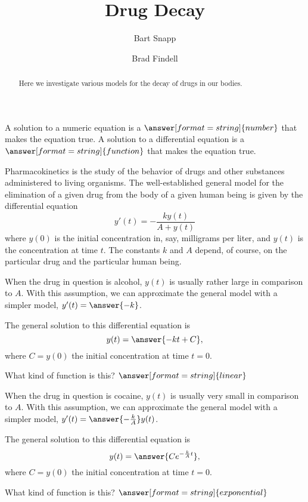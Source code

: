\documentclass{ximera}
\title{Drug Decay}
\author{Bart Snapp \and Brad Findell}
\begin{document}
\begin{abstract}
Here we investigate various models for the decay of drugs in our bodies.  
\end{abstract}
\maketitle

\begin{question}
A solution to a numeric equation is a $\answer[format=string]{number}$ that makes the equation true.  A solution to a differential equation is a $\answer[format=string]{function}$ that makes the equation true.  
\end{question}

Pharmacokinetics is the study of the behavior of drugs and other substances administered to living organisms.  
The well-established general model for 
the elimination of a given drug from the body of a given human being is given by the differential equation 
$$y'(t)=-\frac{ky(t)}{A+y(t)}$$
where $y(0)$ is the initial concentration in, say, milligrams per liter, and $y(t)$ is the concentration at time $t$.  The constants $k$ and $A$ depend, of course, on the particular drug and the particular human being. 


\begin{question}
When the drug in question is alcohol, $y(t)$ is usually rather large in comparison to $A$.   With this assumption, we can approximate the general model with a simpler model, $y'(t)=\answer{-k}$.    

The general solution to this differential equation is 
\[  
y(t) =\answer{ -kt + C}, 
\]
where $C=y(0)$ the initial concentration at time $t=0$.  

What kind of function is this? $\answer[format=string]{linear}$
\end{question}


\begin{question}
When the drug in question is cocaine, $y(t)$ is usually very small in comparison to $A$.   With this assumption, we can approximate the general model with a simpler model, $y'(t)=\answer{-\frac{k}{A}}y(t)$.    

The general solution to this differential equation is 
\[  
y(t) =\answer{Ce^{-\frac{k}{A}t}}, 
\]
where $C=y(0)$ the initial concentration at time $t=0$.  

What kind of function is this? $\answer[format=string]{exponential}$
\end{question}

\end{document}

